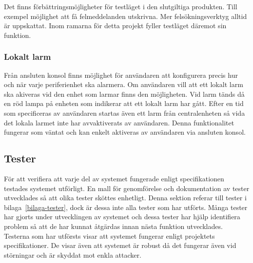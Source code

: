 \documentclass[a4paper]{article}
\begin{document}
Det finns förbättringsmöjligheter för testläget i den slutgiltiga produkten.
Till exempel möjlighet att få felmeddelanden utskrivna.
Mer felsökningsverktyg alltid är uppskattat.
Inom ramarna för detta projekt fyller testläget däremot sin funktion.

\subsubsection{Lokalt larm}
Från ansluten konsol finns möjlighet för användaren att konfigurera precis hur och när varje periferienhet ska alarmera.
Om användaren vill att ett lokalt larm ska akiveras vid den enhet som larmar finns den möjligheten.
Vid larm tänds då en röd lampa på enheten som indikerar att ett lokalt larm har gått.
Efter en tid som specificeras av användaren startas även ett larm från centralenheten så vida det lokala larmet inte har avvaktiverats av användaren.
Denna funktionalitet fungerar som väntat och kan enkelt aktiveras av användaren via ansluten konsol.

\subsection{Tester}
För att verifiera att varje del av systemet fungerade enligt specifikationen testades systemet utförligt.
En mall för genomförelse och dokumentation av tester utvecklades så att olika tester sköttes enhetligt.
Denna sektion referar till tester i bilaga~\ref{bilaga-tester}, dock är dessa inte alla tester som har utförts.
Många tester har gjorts under utvecklingen av systemet och dessa tester har hjälp identifiera problem så att de har kunnat åtgärdas innan nästa funktion utvecklades.
Testerna som har utförsts visar att systemet fungerar enligt projektets specifikationer.
De visar även att systemet är robust då det fungerar även vid störningar och är skyddat mot enkla attacker. 

\end{document}
